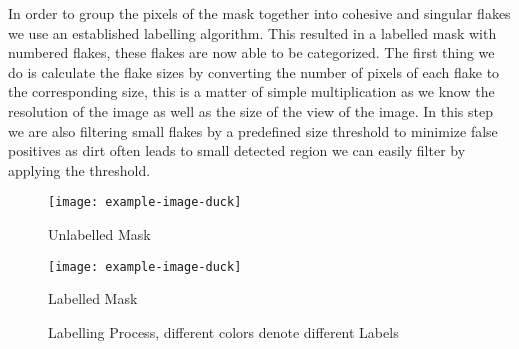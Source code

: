 In order to group the pixels of the mask together into cohesive and singular flakes we use an established labelling algorithm\cite{labeler}. This resulted in a labelled mask with numbered flakes, these flakes are now able to be categorized. The first thing we do is calculate the flake sizes by converting the number of pixels of each flake to the corresponding size, this is a matter of simple multiplication as we know the resolution of the image as well as the size of the view of the image. In this step we are also filtering small flakes by a predefined size threshold to minimize false positives as dirt often leads to small detected region we can easily filter by applying the threshold.\\
\begin{figure}[!h]
\centering
\begin{minipage}{.45\textwidth}
  \centering
  \texttt{[image: example-image-duck]}
  \caption{Unlabelled Mask}
\end{minipage}
\begin{minipage}{.45\textwidth}
  \centering
  \texttt{[image: example-image-duck]}
    \caption{Labelled Mask}
\end{minipage}
\caption{Labelling Process, different colors denote different Labels}
\end{figure}